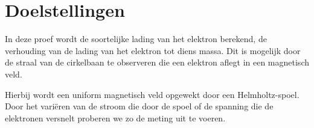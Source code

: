 \section{Doelstellingen}

In deze proef wordt de soortelijke lading van het elektron berekend, de 
verhouding van de lading van het elektron tot diens massa. Dit is mogelijk door 
de straal van de cirkelbaan te observeren die een elektron aflegt in een 
magnetisch veld. 

Hierbij wordt een uniform magnetisch veld opgewekt door een Helmholtz-spoel.  
Door het vari\"eren van de stroom die door de spoel of de spanning die de 
elektronen versnelt proberen we zo de meting uit te voeren.
